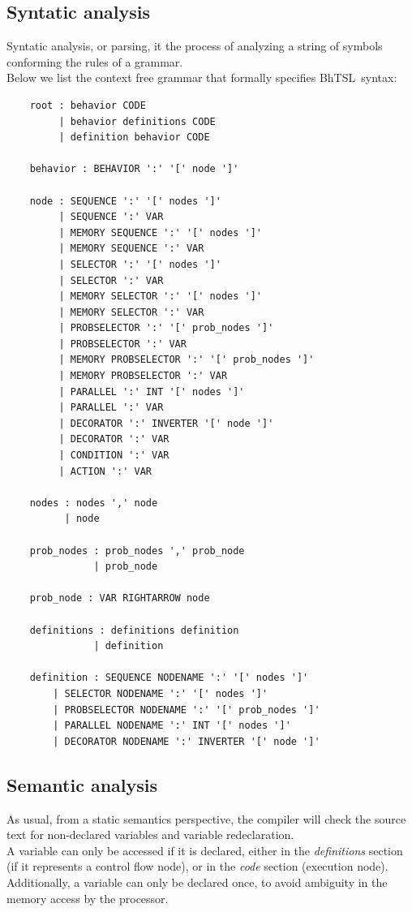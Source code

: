 \documentclass[a4paper,UKenglish,cleveref, autoref, thm-restate]{oasics-v2019}
\def\bht{BhTSL}
\begin{document}
\subsection{Syntatic analysis}
Syntatic analysis, or parsing, it the process of analyzing a string of symbols conforming the rules of a grammar. \\
Below  we list the context free grammar that formally specifies \bht\ syntax:
\begin{lstlisting}
    root : behavior CODE
         | behavior definitions CODE
         | definition behavior CODE

    behavior : BEHAVIOR ':' '[' node ']'

    node : SEQUENCE ':' '[' nodes ']'
         | SEQUENCE ':' VAR
         | MEMORY SEQUENCE ':' '[' nodes ']'
         | MEMORY SEQUENCE ':' VAR
         | SELECTOR ':' '[' nodes ']'
         | SELECTOR ':' VAR
         | MEMORY SELECTOR ':' '[' nodes ']'
         | MEMORY SELECTOR ':' VAR
         | PROBSELECTOR ':' '[' prob_nodes ']'
         | PROBSELECTOR ':' VAR
         | MEMORY PROBSELECTOR ':' '[' prob_nodes ']'
         | MEMORY PROBSELECTOR ':' VAR
         | PARALLEL ':' INT '[' nodes ']'
         | PARALLEL ':' VAR
         | DECORATOR ':' INVERTER '[' node ']'
         | DECORATOR ':' VAR
         | CONDITION ':' VAR
         | ACTION ':' VAR

    nodes : nodes ',' node
          | node

    prob_nodes : prob_nodes ',' prob_node
               | prob_node

    prob_node : VAR RIGHTARROW node

    definitions : definitions definition
               | definition

    definition : SEQUENCE NODENAME ':' '[' nodes ']'
        | SELECTOR NODENAME ':' '[' nodes ']'
        | PROBSELECTOR NODENAME ':' '[' prob_nodes ']'
        | PARALLEL NODENAME ':' INT '[' nodes ']'
        | DECORATOR NODENAME ':' INVERTER '[' node ']'
\end{lstlisting}

\subsection{Semantic analysis}
As usual, from a static semantics perspective, the compiler will check the source text
for non-declared variables and variable redeclaration.\\
A variable can only be accessed if it is declared, either in the \textit{definitions} section
(if it represents a control flow node), or in the \textit{code} section (execution node).
Additionally, a variable can only be declared once, to avoid ambiguity in the memory access by the processor.
\end{document}

